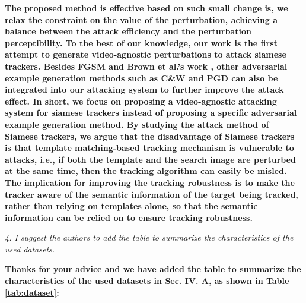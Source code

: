 \documentclass[12pt]{article}
\begin{document}
\textbf{
The proposed method is effective based on such small change is, we relax the constraint on the value of the perturbation, achieving a balance between the attack efficiency and the perturbation perceptibility.
To the best of our knowledge, our work is the first attempt to generate video-agnostic perturbations to attack siamese trackers. Besides FGSM \cite{FGSM} and Brown et al.'s work \cite{patch}, other adversarial example generation methods such as C\&W \cite{carlini2017towards} and PGD \cite{PGD} can also be integrated into our attacking system to further improve the attack effect.
In short, we focus on proposing a video-agnostic attacking system for siamese trackers instead of proposing a specific adversarial example generation method.
By studying the attack method of Siamese trackers, we argue that the disadvantage of Siamese trackers is that template matching-based tracking mechanism is vulnerable to attacks, i.e., if both the template and the search image are perturbed at the same time, then the tracking algorithm can easily be misled.
The implication for improving the tracking robustness is to make the tracker aware of the semantic information of the target being tracked, rather than relying on templates alone, so that the semantic information can be relied on to ensure tracking robustness.}

\textit{4. I suggest the authors to add the table to summarize the characteristics of the used datasets.}

\textbf{Thanks for your advice and we have added the table to summarize the characteristics of the used datasets in Sec. IV. A, as shown in Table \ref{tab:dataset}:}
\end{document}
